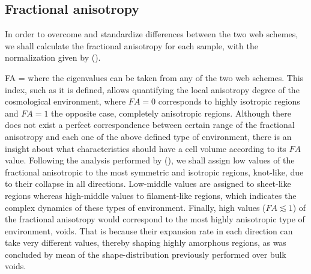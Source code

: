\documentclass[a4,useAMS,usenatbib,usegraphicx]{latex/mn2e}
\begin{document}
\subsection{Fractional anisotropy}
\label{subsec:fractional_anisotropy}



In order to overcome and standardize differences between the two web 
schemes, we shall calculate the fractional anisotropy for each sample, 
with the normalization given by ().



{ FA =  }
where the eigenvalues can be taken from any of the two web schemes. This 
index, such as it is defined, allows quantifying the local anisotropy 
degree of the cosmological environment, where $FA=0$ corresponds to highly
isotropic regions and $FA=1$ the opposite case, completely anisotropic 
regions. Although there does not exist a perfect correspondence between 
certain range of the fractional anisotropy and each one of the above defined
type of environment, there is an insight about what characteristics should 
have a cell volume according to its $FA$ value. Following the analysis 
performed by (), we shall assign low values of the 
fractional anisotropic to the most symmetric and isotropic regions, 
knot-like, due to their collapse in all directions. Low-middle values are 
assigned to sheet-like regions whereas high-middle values to filament-like 
regions, which indicates the complex dynamics of these types of environment. 
Finally, high values ($FA \lesssim 1$) of the fractional anisotropy would
correspond to the most highly anisotropic type of environment, voids. That
is because their expansion rate in each direction can take very different 
values, thereby shaping highly amorphous regions, as was concluded 
by mean of the shape-distribution previously performed over bulk voids.
\end{document}
